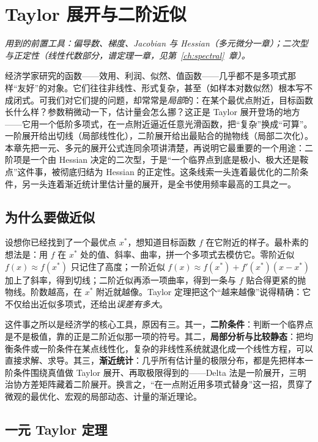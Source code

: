 \chapter{Taylor 展开与二阶近似}
\label{ch:taylor}

\noindent\emph{用到的前置工具：偏导数、梯度、Jacobian 与 Hessian（多元微分一章）；二次型与正定性（线性代数部分，谱定理一章，见第~\ref{ch:spectral}~章）。}
\medskip

经济学家研究的函数——效用、利润、似然、值函数——几乎都不是多项式那样``友好''的对象。它们往往非线性、形式复杂，甚至（如样本对数似然）根本写不成闭式。可我们对它们提的问题，却常常是\emph{局部}的：在某个最优点附近，目标函数长什么样？参数稍微动一下，估计量会怎么挪？这正是 Taylor 展开登场的地方——它用一个低阶多项式，在一点附近逼近任意光滑函数，把``复杂''换成``可算''。一阶展开给出切线（局部线性化），二阶展开给出最贴合的抛物线（局部二次化）。本章先把一元、多元的展开公式连同余项讲清楚，再说明它最重要的一个用途：二阶项是一个由 Hessian 决定的二次型，于是``一个临界点到底是极小、极大还是鞍点''这件事，被彻底归结为 Hessian 的正定性。这条线索一头连着最优化的二阶条件，另一头连着渐近统计里估计量的展开，是全书使用频率最高的工具之一。

\section{为什么要做近似}
\label{sec:taylor-motivation}

设想你已经找到了一个最优点 $x^*$，想知道目标函数 $f$ 在它附近的样子。最朴素的想法是：用 $f$ 在 $x^*$ 处的值、斜率、曲率，拼一个多项式去模仿它。零阶近似 $f(x)\approx f(x^*)$ 只记住了高度；一阶近似 $f(x)\approx f(x^*)+f'(x^*)(x-x^*)$ 加上了斜率，得到切线；二阶近似再添一项曲率，得到一条与 $f$ 贴合得更紧的抛物线。阶数越高，在 $x^*$ 附近就越像。Taylor 定理把这个``越来越像''说得精确：它不仅给出近似多项式，还给出\emph{误差有多大}。

这件事之所以是经济学的核心工具，原因有三。其一，\textbf{二阶条件}：判断一个临界点是不是极值，靠的正是二阶近似那一项的符号。其二，\textbf{局部分析与比较静态}：把均衡条件或一阶条件在某点线性化，复杂的非线性系统就退化成一个线性方程，可以直接求解、求导。其三，\textbf{渐近统计}：几乎所有估计量的极限分布，都是先把样本一阶条件围绕真值做 Taylor 展开、再取极限得到的——Delta 法是一阶展开，三明治协方差矩阵藏着二阶展开。换言之，``在一点附近用多项式替身''这一招，贯穿了微观的最优化、宏观的局部动态、计量的渐近理论。

\section{一元 Taylor 定理}
\label{sec:taylor-univariate}

